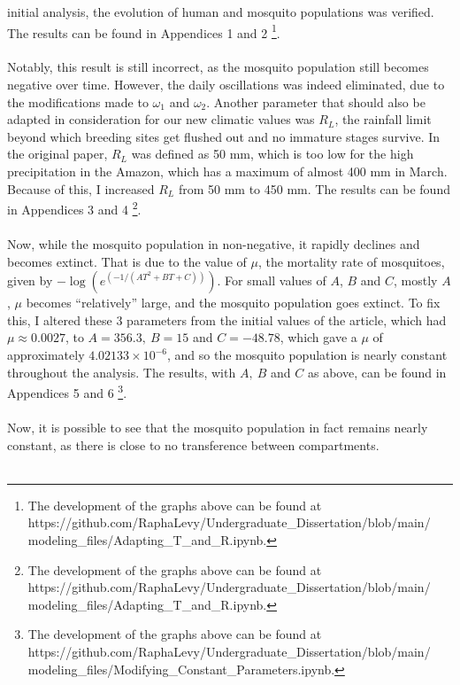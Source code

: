 initial analysis, the evolution of human and mosquito populations 
was verified.  
The results can be found in Appendices 1 and 2 
\footnote{The development of the graphs above can be found at 
https://github.com/RaphaLevy/Undergraduate\_Dissertation/blob/main/
\\modeling\_files/Adapting\_T\_and\_R.ipynb.}. 
\\\\
Notably, this result is still incorrect, as the mosquito population
still becomes negative over time. 
However, the daily oscillations
was indeed eliminated, due to the modifications made to $\omega_1$ and $\omega_2$.
Another parameter that should also be adapted in consideration for our new climatic
values was $R_L$, the rainfall limit beyond which breeding sites get flushed out and no 
immature stages survive. In the original paper, $R_L$ was defined as 50 mm, which is
too low for the high precipitation in the Amazon, which has a maximum of almost
400 mm in March. Because of this, I increased $R_L$ from 50 mm to 450 mm.
The results can be found in Appendices 3 and 4 
\footnote{The development of the graphs above can be found at 
https://github.com/RaphaLevy/Undergraduate\_Dissertation/blob/main/
\\modeling\_files/Adapting\_T\_and\_R.ipynb.}.
\\\\
Now, while the mosquito population in non-negative, it rapidly declines and
becomes extinct. That is due to the value of $\mu$, the mortality rate of mosquitoes,
given by $-\log(e^{(-1 / (AT^2 + BT + C))})$. For small values of 
$A$, $B$ and $C$, mostly $A$, $\mu$ becomes ``relatively'' large, and the mosquito
population goes extinct. To fix this, I altered these 3 parameters from the initial values 
of the article, which had $\mu \approx 0.0027$, to $A=356.3, \ B=15$
and $C=-48.78$, which gave a $\mu$ of approximately $4.02133 \times 10^{-6}$, 
and so the mosquito population is nearly constant throughout the analysis.
The results, with $A, \ B$
and $C$ as above, can be found in Appendices 5 and 6 
\footnote{The development of the graphs above can be found at 
https://github.com/RaphaLevy/Undergraduate\_Dissertation/blob/main/
\\modeling\_files/Modifying\_Constant\_Parameters.ipynb.}.
\\\\
Now, it is possible to see that the mosquito population in fact remains nearly constant,
as there is close to no transference between compartments.
\\\\

